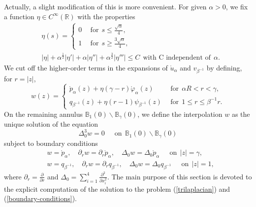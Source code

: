 \documentclass[11pt,letterpaper]{amsart}
\newcommand{\bB}{\mathbb{B}}
\newcommand{\bR}{\mathbb{R}}
\theoremstyle{definition}
\theoremstyle{remark}
\numberwithin{equation}{section}
\begin{document}
Actually, a slight modification of this is more convenient. For given $\alpha>0$, we fix a function $\eta\in C^{\infty}(\bR)$ with the properties
\begin{equation*}
\begin{split}
    &\eta(s)=\left\{ 
    \begin{array}{cc}
      0  & ~~\mbox{for}~~ s\leq \frac{\sqrt{\alpha}}{4}, \\
      1  & ~~\mbox{for}~~ s\geq \frac{3\sqrt{\alpha}}{4},
    \end{array}
    \right.\\
    & |\eta|+\alpha^{\frac{1}{2}}|\eta'|+\alpha |\eta''|+\alpha^{\frac{3}{2}}|\eta'''|\leq C ~~\mbox{with C independent of}~~ \alpha.  
    \end{split}
\end{equation*}
We cut off the higher-order terms in the expansions of $\mathring{u}_{\alpha}$ and $v_{\beta^{-1}}$ by defining, for $r=|z|$,
\begin{equation*}
    w(z)=\left\{
    \begin{array}{cc}
       \mathring{p}_{\alpha}(z)+\eta(\gamma-r)\mathring{\varphi}_{\alpha}(z) &~~\mbox{for}~~  \alpha R<r< \gamma,  \\
       q_{\beta^{-1}}(z)+\eta(r-1)\psi_{\beta^{-1}}(z)   & ~~\mbox{for}~~ 1\leq r\leq \beta^{-1}r.
    \end{array}
    \right.
\end{equation*}
On the remaining annulus $\bB_1(0)\backslash \bB_{\gamma}(0)$, we define the interpolation $w$ as the unique solution of the equation
\begin{equation}\label{trilaplacian}
    \Delta_0^3 w=0 \quad ~~\mbox{on}~~ \bB_1(0)\backslash \bB_{\gamma}(0)
\end{equation}
subject to boundary conditions
\begin{equation}\label{boundary-conditions}
    \begin{split}
        & w=\mathring{p}_{\alpha}, \quad \partial_r w=\partial_r \mathring{p}_{\alpha}, \quad \Delta_0 w=\Delta_0 \mathring{p}_{\alpha}\quad ~~\mbox{on}~~ |z|=\gamma,\\
        & w=q_{\beta^{-1}}, \quad \partial_r w=\partial_r q_{\beta^{-1}}, \quad \Delta_0 w=\Delta_0 q_{\beta^{-1}}\quad ~~\mbox{on}~~ |z|=1,
    \end{split}
\end{equation}
where $\partial_r=\frac{\partial}{\partial r}$ and $\Delta_0=\sum_{i=1}^{4}\frac{\partial^2}{\partial x_i^2}$. The main purpose of this section is devoted to the explicit computation of the solution to the problem (\ref{trilaplacian}) and (\ref{boundary-conditions}). 
\end{document}
